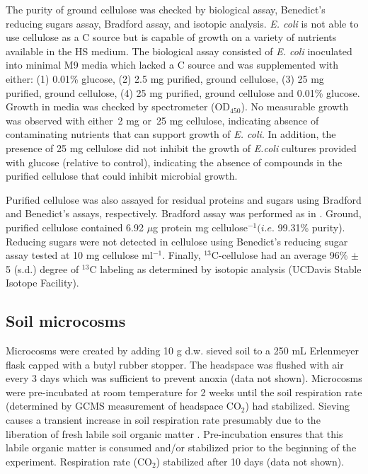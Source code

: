 \documentclass{article}
\begin{document}
The purity of ground cellulose was checked by biological assay, Benedict's
reducing sugars assay, Bradford assay, and isotopic analysis. \textit{E. coli}
is not able to use cellulose as a C source but is capable of growth on
a variety of nutrients available in the HS medium. The biological assay
consisted of \textit{E. coli} inoculated into minimal M9 media which lacked
a C source and was supplemented with either: (1) 0.01\% glucose, (2) 2.5 mg
purified, ground cellulose, (3) 25 mg purified, ground cellulose, (4) 25 mg
purified, ground cellulose and 0.01\% glucose. Growth in media was checked by
spectrometer (OD$_{450}$). No measurable growth was observed with either~2 mg
or~25 mg cellulose, indicating absence of contaminating nutrients that can
support growth of \textit{E. coli}. In addition, the presence of 25 mg
cellulose did not inhibit the growth of \textit{E.coli} cultures provided with
glucose (relative to control), indicating the absence of compounds in the
purified cellulose that could inhibit microbial growth.

Purified cellulose was also assayed for residual proteins and sugars using
Bradford and Benedict's assays, respectively. Bradford assay was performed as
in \citep{Bradford_1976}. Ground, purified cellulose contained 6.92 $\mu$g protein mg
cellulose$^{-1} (\textit{i.e.}$ 99.31\% purity). Reducing sugars were not
detected in cellulose using Benedict's reducing sugar assay
\citep{benedict1909reagent} tested at 10 mg cellulose ml$^{-1}$. Finally,
$^{13}$C-cellulose had an average 96\% $\pm$
5 (s.d.) degree of $^{13}$C labeling as determined by isotopic analysis
  (UCDavis Stable Isotope Facility).           

\subsection{Soil microcosms}
Microcosms were created by adding 10 g d.w. sieved soil to a 250 mL
Erlenmeyer flask capped with a butyl rubber stopper. The headspace was flushed
with air every 3 days which was sufficient to prevent anoxia (data not shown).
Microcosms were pre-incubated at room temperature for 2 weeks until the soil
respiration rate (determined by GCMS measurement of headspace CO$_{2}$) had
stabilized. Sieving causes a transient increase in soil respiration rate
presumably due to the liberation of fresh labile soil organic matter
\citep{Datta_2014}. Pre-incubation ensures that this labile organic matter is
consumed and/or stabilized prior to the beginning of the experiment.
Respiration rate (CO$_{2}$) stabilized after 10 days (data not shown). 
\end{document}
